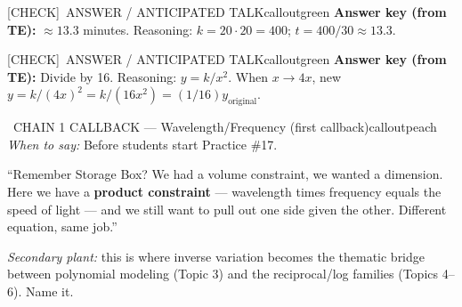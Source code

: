 \documentclass[11pt]{article}
\newcommand{\IconCheck}{[CHECK]}
\newcommand{\teacheranswerbox}[2]{%
  \begin{callout}{#1}{calloutgreen}
  #2
  \end{callout}
}
\begin{document}

\teacheranswerbox{\IconCheck\ ANSWER / ANTICIPATED TALK}{%
\textbf{Answer key (from TE):} \(\approx 13.3\) minutes. Reasoning: \(k = 20\cdot 20 = 400\); \(t = 400/30 \approx 13.3\).
}


\teacheranswerbox{\IconCheck\ ANSWER / ANTICIPATED TALK}{%
\textbf{Answer key (from TE):} Divide by 16. Reasoning: \(y = k/x^2\). When \(x \rightarrow 4x\), new \(y = k/(4x)^2 = k/(16x^2) = (1/16)y_{\text{original}}\).
}

\begin{callout}{\IconSpeak\ CHAIN 1 CALLBACK --- Wavelength/Frequency (first callback)}{calloutpeach}
\textit{When to say:} Before students start Practice \#17.

\smallskip
``Remember Storage Box? We had a volume constraint, we wanted a dimension. Here we have a \textbf{product constraint} --- wavelength times frequency equals the speed of light --- and we still want to pull out one side given the other. Different equation, same job.''

\smallskip
\textit{Secondary plant:} this is where inverse variation becomes the thematic bridge between polynomial modeling (Topic 3) and the reciprocal/log families (Topics 4--6). Name it.
\end{callout}
\end{document}
